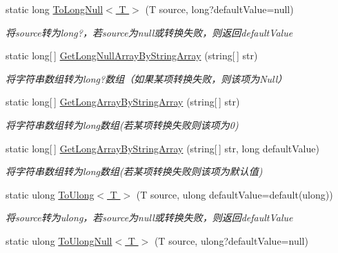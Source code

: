 \begin{DoxyCompactItemize}
static long \hyperlink{class_x_c_l_net_tools_1_1_common_1_1_data_type_convert_a7ee93040c947bfbdbb3c0d78d4aa9226}{To\-Long\-Null$<$ T $>$} (T source, long?default\-Value=null)
\begin{DoxyCompactList}\small\item\em 将source转为long?，若source为null或转换失败，则返回default\-Value \end{DoxyCompactList}\item 
static long\mbox{[}$\,$\mbox{]} \hyperlink{class_x_c_l_net_tools_1_1_common_1_1_data_type_convert_a67fc25be608a1e2f701e986b25bb5821}{Get\-Long\-Null\-Array\-By\-String\-Array} (string\mbox{[}$\,$\mbox{]} str)
\begin{DoxyCompactList}\small\item\em 将字符串数组转为long?数组（如果某项转换失败，则该项为\-Null） \end{DoxyCompactList}\item 
static long\mbox{[}$\,$\mbox{]} \hyperlink{class_x_c_l_net_tools_1_1_common_1_1_data_type_convert_ab6f926a9f94557017048ab3f8e4888ea}{Get\-Long\-Array\-By\-String\-Array} (string\mbox{[}$\,$\mbox{]} str)
\begin{DoxyCompactList}\small\item\em 将字符串数组转为long数组(若某项转换失败则该项为0) \end{DoxyCompactList}\item 
static long\mbox{[}$\,$\mbox{]} \hyperlink{class_x_c_l_net_tools_1_1_common_1_1_data_type_convert_ad786581f0cbd2158d4f345104b15d487}{Get\-Long\-Array\-By\-String\-Array} (string\mbox{[}$\,$\mbox{]} str, long default\-Value)
\begin{DoxyCompactList}\small\item\em 将字符串数组转为long数组(若某项转换失败则该项为默认值) \end{DoxyCompactList}\item 
static ulong \hyperlink{class_x_c_l_net_tools_1_1_common_1_1_data_type_convert_ab4e2db26e84855a2f64cdde1e683e5bc}{To\-Ulong$<$ T $>$} (T source, ulong default\-Value=default(ulong))
\begin{DoxyCompactList}\small\item\em 将source转为ulong，若source为null或转换失败，则返回default\-Value \end{DoxyCompactList}\item 
static ulong \hyperlink{class_x_c_l_net_tools_1_1_common_1_1_data_type_convert_a339b105fc543362020f3bc66cf30b7b3}{To\-Ulong\-Null$<$ T $>$} (T source, ulong?default\-Value=null)

\end{DoxyCompactItemize}
